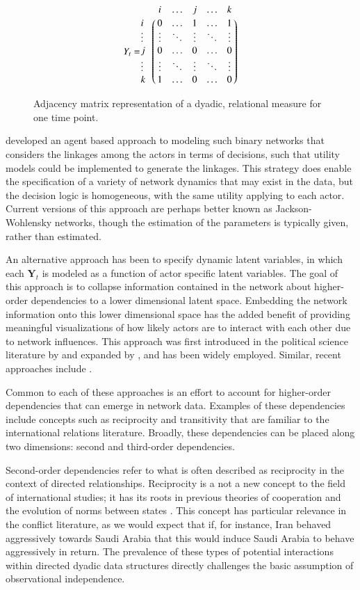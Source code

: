 \documentclass[3p,times,twocolumn,authoryear,12pt]{elsarticle}
\let\bbordermatrix\bordermatrix
\newcommand{\bl}[1]{{\mathbf #1}}
\begin{document}
\begin{figure}[ht]
\begin{equation*}
Y_{t} = \bbordermatrix{
	~ & i  & \ldots & j & \ldots & k \cr
	i & 0  & \ldots & 1 & \ldots & 1 \cr
	\vdots & \vdots & \ddots & \vdots & \ddots & \vdots  \cr
	j & 0  & \ldots & 0  & \ldots & 0 \cr 
	\vdots & \vdots & \ddots & \vdots & \ddots & \vdots \cr
	k & 1  & \ldots & 0  & \ldots & 0 \cr 		
	}
\end{equation*}
	\caption{Adjacency matrix representation of a dyadic, relational measure for one time point.}
	\label{fig:matrix}
\end{figure}

\citet{snijders:2001} developed an agent based approach to modeling such binary networks that considers the linkages among the actors in terms of decisions, such that utility models could be implemented to generate the linkages. This strategy does enable the specification of a variety of network dynamics that may exist in the data, but the decision logic is homogeneous, with the same utility applying to each actor. Current versions of this approach are perhaps better known as Jackson-Wohlensky networks, though the estimation of the parameters is typically given, rather than estimated.

An alternative approach has been to specify dynamic latent variables, in which each $\bl Y_t$ is modeled as a function of actor specific latent variables. The goal of this approach is to collapse information contained in the network about higher-order dependencies to a lower dimensional latent space. Embedding the network information onto this lower dimensional space has the added benefit of providing meaningful visualizations of how likely actors are to interact with each other due to network influences. This approach was first introduced in the political science literature by \citet{ward:hoff:2007} and expanded by \citet{ward:ahlquist:etal:2012}, and has been widely employed. Similar, recent approaches include \citet{durante:dunson:2014}. 

Common to each of these approaches is an effort to account for higher-order dependencies that can emerge in network data. Examples of these dependencies include concepts such as reciprocity and transitivity that are familiar to the international relations literature. Broadly, these dependencies can be placed along two dimensions: second and third-order dependencies. 

Second-order dependencies refer to what is often described as reciprocity in the context of directed relationships. Reciprocity is a not a new concept to the field of international studies; it has its roots in previous theories of cooperation and the evolution of norms between states \citep{richardson:1960,choucri:north:1972,ward:1981,cusack:ward:1981,ward:1984,goldstein:1991}. This concept has particular relevance in the conflict literature, as we would expect that if, for instance, Iran behaved aggressively towards Saudi Arabia that this would induce Saudi Arabia to behave aggressively in return. The prevalence of these types of potential interactions within directed dyadic data structures directly challenges the basic assumption of observational independence.
\end{document}
